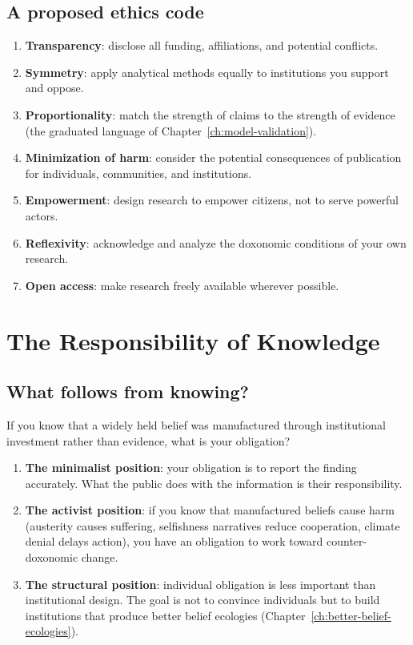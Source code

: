 \subsection{A proposed ethics code}

\begin{model}
\label{mod:ethics-code}
\begin{enumerate}[nosep]
  \item \textbf{Transparency}: disclose all funding, affiliations, and potential conflicts.
  \item \textbf{Symmetry}: apply analytical methods equally to institutions you support and oppose.
  \item \textbf{Proportionality}: match the strength of claims to the strength of evidence (the graduated language of Chapter~\ref{ch:model-validation}).
  \item \textbf{Minimization of harm}: consider the potential consequences of publication for individuals, communities, and institutions.
  \item \textbf{Empowerment}: design research to empower citizens, not to serve powerful actors.
  \item \textbf{Reflexivity}: acknowledge and analyze the doxonomic conditions of your own research.
  \item \textbf{Open access}: make research freely available wherever possible.
\end{enumerate}
\end{model}

\section{The Responsibility of Knowledge}
\label{sec:ch34-responsibility}

\subsection{What follows from knowing?}

If you know that a widely held belief was manufactured through institutional investment rather than evidence, what is your obligation?

\begin{enumerate}
  \item \textbf{The minimalist position}: your obligation is to report the finding accurately.
  What the public does with the information is their responsibility.

  \item \textbf{The activist position}: if you know that manufactured beliefs cause harm (austerity causes suffering, selfishness narratives reduce cooperation, climate denial delays action), you have an obligation to work toward counter-doxonomic change.

  \item \textbf{The structural position}: individual obligation is less important than institutional design.
  The goal is not to convince individuals but to build institutions that produce better belief ecologies (Chapter~\ref{ch:better-belief-ecologies}).
\end{enumerate}

